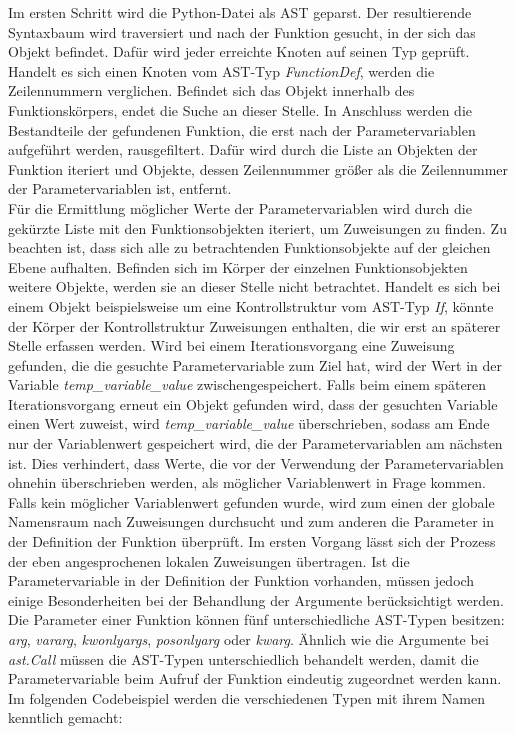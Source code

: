 \documentclass[german,bachelor]{swsLeipzig}
\begin{document}
Im ersten Schritt wird die Python-Datei als AST geparst.
Der resultierende Syntaxbaum wird traversiert und nach der Funktion gesucht, in der sich das Objekt befindet.
Dafür wird jeder erreichte Knoten auf seinen Typ geprüft.
Handelt es sich einen Knoten vom AST-Typ \textit{FunctionDef}, werden die Zeilennummern verglichen.
Befindet sich das Objekt innerhalb des Funktionskörpers, endet die Suche an dieser Stelle.
In Anschluss werden die Bestandteile der gefundenen Funktion, die erst nach der Parametervariablen aufgeführt werden, rausgefiltert.
Dafür wird durch die Liste an Objekten der Funktion iteriert und Objekte, dessen Zeilennummer größer als die Zeilennummer der Parametervariablen
ist, entfernt.\\

Für die Ermittlung möglicher Werte der Parametervariablen wird durch die gekürzte Liste mit den Funktionsobjekten iteriert, um
Zuweisungen zu finden.
Zu beachten ist, dass sich alle zu betrachtenden Funktionsobjekte auf der gleichen Ebene aufhalten.
Befinden sich im Körper der einzelnen Funktionsobjekten weitere Objekte, werden sie an dieser Stelle
nicht betrachtet.
Handelt es sich bei einem Objekt beispielsweise um eine Kontrollstruktur vom AST-Typ \textit{If}, könnte der Körper der
Kontrollstruktur Zuweisungen enthalten, die wir erst an späterer Stelle erfassen werden.
Wird bei einem Iterationsvorgang eine Zuweisung gefunden, die die gesuchte Parametervariable zum Ziel hat, wird der Wert in der
Variable \textit{temp\_variable\_value} zwischengespeichert.
Falls beim einem späteren Iterationsvorgang erneut ein Objekt gefunden wird, dass der gesuchten Variable einen Wert zuweist,
wird \textit{temp\_variable\_value} überschrieben, sodass am Ende nur der Variablenwert gespeichert wird, die der Parametervariablen am
nächsten ist.
Dies verhindert, dass Werte, die vor der Verwendung der Parametervariablen ohnehin überschrieben werden, als möglicher
Variablenwert in Frage kommen. \\

Falls kein möglicher Variablenwert gefunden wurde, wird zum einen der globale Namensraum nach Zuweisungen durchsucht und
zum anderen die Parameter in der Definition der Funktion überprüft.
Im ersten Vorgang lässt sich der Prozess der eben angesprochenen lokalen Zuweisungen übertragen.
Ist die Parametervariable in der Definition der Funktion vorhanden, müssen jedoch einige Besonderheiten bei der Behandlung der Argumente
berücksichtigt werden.
Die Parameter einer Funktion können fünf unterschiedliche AST-Typen besitzen: \textit{arg}, \textit{vararg}, \textit{kwonlyargs},
\textit{posonlyarg} oder \textit{kwarg}.
Ähnlich wie die Argumente bei \textit{ast.Call} müssen die AST-Typen unterschiedlich behandelt werden, damit die Parametervariable
beim Aufruf der Funktion eindeutig zugeordnet werden kann.
Im folgenden Codebeispiel werden die verschiedenen Typen mit ihrem Namen kenntlich gemacht: \\
\end{document}

